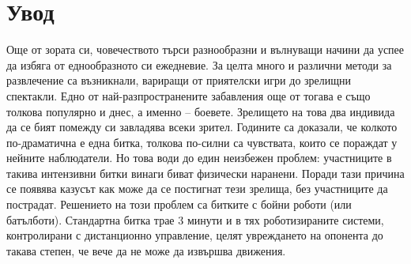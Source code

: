\chapter{Увод}
Още от зората си, човечеството търси разнообразни и вълнуващи начини да успее да избяга от еднообразното си ежедневие. За целта много и различни методи за развлечение са възникнали, вариращи от приятелски игри до зрелищни спектакли. Едно от най-разпространените забавления още от тогава е също толкова популярно и днес, а именно – боевете. Зрелището на това два индивида да се бият помежду си завладява всеки зрител. Годините са доказали, че колкото по-драматична е една битка, толкова по-силни са чувствата, които се пораждат у нейните наблюдатели. Но това води до един неизбежен проблем: участниците в такива интензивни битки винаги биват физически наранени. Поради тази причина се появява казусът как може да се постигнат тези зрелища, без участниците да пострадат. Решението на този проблем са битките с бойни роботи (или батълботи). Стандартна битка трае 3 минути и в тях роботизираните системи, контролирани с дистанционно управление, целят увреждането на опонента до такава степен, че вече да не може да извършва движения.